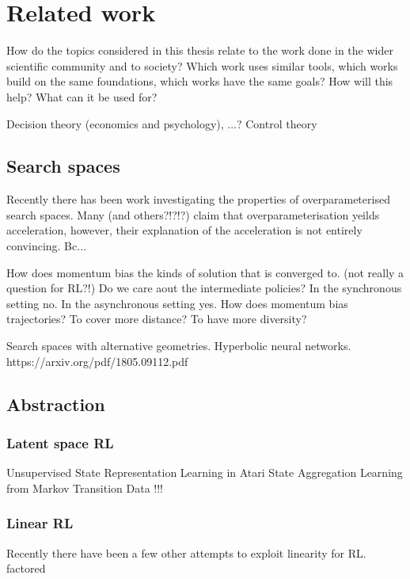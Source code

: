 \chapter{Related work}

How do the topics considered in this thesis relate to the work done in the wider scientific community and to society? Which work uses similar tools, which works build on the same foundations, which works have the same goals? How will this help? What can it be used for?

Decision theory (economics and psychology), ...?
Control theory

\section{Search spaces}

Recently there has been work investigating the properties of overparameterised search spaces.
Many \cite{Arora2018} (and others?!?!?) claim that overparameterisation yeilds acceleration, however,
their explanation of the acceleration is not entirely convincing. Bc...

How does momentum bias the kinds of solution that is converged to. (not really a question for RL?!)
Do we care aout the intermediate policies? In the synchronous setting no. In the asynchronous setting yes.
How does momentum bias trajectories? To cover more distance? To have more diversity?

Search spaces with alternative geometries.
Hyperbolic neural networks. https://arxiv.org/pdf/1805.09112.pdf


\section{Abstraction}

\subsection{Latent space RL}

Unsupervised State Representation Learning in Atari  \cite{Anand2019}
State Aggregation Learning from Markov Transition Data  !!!\cite{Duan2018}

\subsection{Linear RL}

Recently there have been a few other attempts to exploit linearity for RL.
\cite{Pires2016} factored

